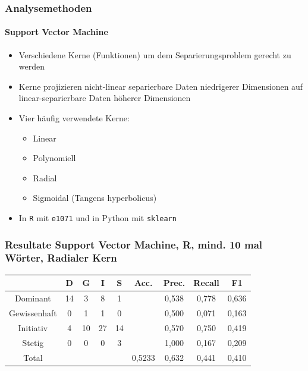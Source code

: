 \documentclass{beamer}
\begin{document}
\begin{frame}
\frametitle{Analysemethoden}
\framesubtitle{Support Vector Machine}
\begin{itemize}\setlength\parskip{12pt}
	\item Verschiedene Kerne (Funktionen) um dem Separierungsproblem gerecht zu werden
	\item Kerne projizieren nicht-linear separierbare Daten niedrigerer Dimensionen auf linear-separierbare Daten höherer Dimensionen
	\item Vier häufig verwendete Kerne:
	\begin{itemize}
		\item Linear
		\item Polynomiell
		\item Radial
		\item Sigmoidal (Tangens hyperbolicus)
	\end{itemize}
	\item In \texttt{R} mit \texttt{e1071} und in Python mit \texttt{sklearn}
\end{itemize}
\end{frame}
\begin{frame}
\frametitle{Resultate Support Vector Machine, R, mind. 10 mal Wörter, Radialer Kern}
\begin{center}
\begin{tabular}{|c|c|c|c|c|c|c|c|c|}
\hline
				& D 	& G	& I & S	& Acc.	& Prec. & Recall	& F1\\
\hline
Dominant 		& 14		& 3 			& 8 		& 1 		&       	& 0,538 	& 0,778 	& 0,636\\
Gewissenhaft 	& 0 		& 1 			& 1 		& 0 		& 			& 0,500 	& 0,071 	& 0,163\\
Initiativ 		& 4 		& 10			& 27		& 14		& 			& 0,570		& 0,750 	& 0,419\\
Stetig 			& 0 		& 0 			& 0 		& 3 		& 			& 1,000	   	& 0,167 	& 0,209\\
\hline
Total 			& 			& 				& 			& 			& 0,5233	& 0,632		& 0,441  	& 0,410\\
\hline
\end{tabular}
\end{center}
\end{frame}
\end{document}
